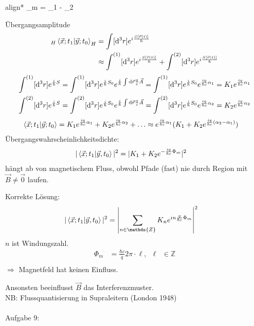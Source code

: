 	\begin{empheq}[box=\boxed]{align*}
		\Phi_m = \alpha_1 - \alpha_2
	\end{empheq}
Übergangsamplitude
	\begin{align*}
		{}_H \braket{\vec{x}; t_1 | \vec{y}; t_0}_H &= 
		\int [\mathrm{d}^3 r] e^{i \frac{S[\vec{r}(t)]}{\hbar}} \\
		&\approx \int^{(1)} [\mathrm{d}^3 r] e^{i \frac{S[\vec{r}(t)]}{\hbar}} 
		+ \int^{(2)} [\mathrm{d}^3 r] e^{i \frac{S[\vec{r}(t)]}{\hbar}} 
	\end{align*}
	\begin{align*}
		\int^{(1)} [\mathrm{d}^3 r] e^{\frac{i}{\hbar} S} &=
		\int^{(1)} [\mathrm{d}^3 r] e^{\frac{i}{\hbar} S_0} e^{\frac{i}{\hbar} \int \mathrm{d} \vec{r} \frac{q}{c} \vec{A}} 
		= \int^{(1)} [\mathrm{d}^3 r] e^{\frac{i}{\hbar} S_0} e^{\frac{iq}{\hbar c} \alpha_1}  
		= K_1 e^{\frac{iq}{\hbar c} \alpha_1}\\
		\int^{(2)} [\mathrm{d}^3 r] e^{\frac{i}{\hbar} S} &=
		\int^{(2)} [\mathrm{d}^3 r] e^{\frac{i}{\hbar} S_0} e^{\frac{i}{\hbar} \int \mathrm{d} \vec{r} \frac{q}{c} \vec{A}} 
		= \int^{(2)} [\mathrm{d}^3 r] e^{\frac{i}{\hbar} S_0} e^{\frac{iq}{\hbar c} \alpha_2}
		=K_2 e^{\frac{iq}{\hbar c} \alpha_2}
	\end{align*}
	\begin{align*}
		\braket{\vec{x}; t_1| \vec{y}; t_0} &= 
		K_1 e^{\frac{iq}{\hbar c} \alpha_1} + K_2 e^{\frac{iq}{\hbar c} \alpha_2} + \ldots 
		\approx e^{\frac{iq}{\hbar c} \alpha_1} (K_1 + K_2 e^{\frac{iq}{\hbar c} (\alpha_2 -\alpha_1)})
	\end{align*}
Übergangswahrscheinlichkeitsdichte:
	\begin{align*}
		|\braket{\vec{x}; t_1 | \vec{y} , t_0}|^2 &=
		| K_1 + K_2 e^{-\frac{iq}{\hbar c} \Phi_m}|^2
	\end{align*}
hängt ab von magnetischem Fluss, obwohl Pfade (fast) nie durch Region mit $\vec{B}\neq \vec{0}$ laufen.

Korrekte Lösung:
	\begin{align*}
		|\braket{\vec{x}; t_1 | \vec{y} , t_0}|^2 &=
		\left|
			\sum_{n\in\mathds{Z}} K_{n} e^{in \frac{q}{\hbar c} \Phi_m}
		\right|^2
	\end{align*}
$n$ ist Windungszahl.
	\begin{align*}
		\Phi_m &= \frac{\hbar c}{q} 2\pi \cdot \ell ,& \ell&\in \mathds{Z} \\
	\end{align*}
$\Rightarrow$ Magnetfeld hat keinen Einfluss.

Ansonsten beeinflusst $\vec{B}$ das Interferenzmuster. 
\\
NB: Flussquantisierung in Supraleitern (London 1948)
\\ \\
Aufgabe 9:


